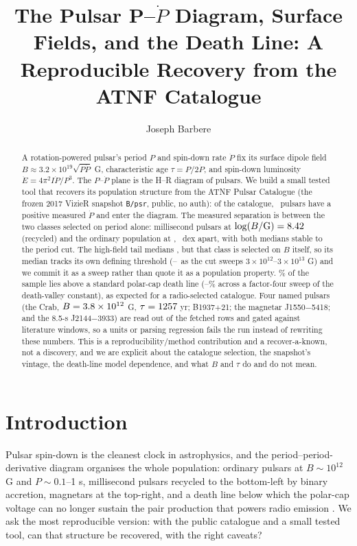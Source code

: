 \documentclass[twocolumn]{aastex631}
\newcommand{\code}[1]{\texttt{#1}}
\begin{document}
\title{The Pulsar P--$\dot P$ Diagram, Surface Fields, and the Death Line:
A Reproducible Recovery from the ATNF Catalogue}

\author[0009-0008-3289-4447]{Joseph Barbere}

\begin{abstract}
A rotation-powered pulsar's period $P$ and spin-down rate $\dot P$ fix its surface dipole field
$B\approx3.2\times10^{19}\sqrt{P\dot P}$ G, characteristic age $\tau=P/2\dot P$, and spin-down
luminosity $\dot E=4\pi^2 I\dot P/P^3$. The $P$--$\dot P$ plane is the H--R diagram of pulsars. We build
a small tested tool that recovers its population structure from the ATNF Pulsar Catalogue
\citep{manchester2005} (the frozen 2017 VizieR snapshot \code{B/psr}, public, no auth): of the
catalogue, \ppN\ pulsars have a positive measured $\dot P$ and enter the diagram. The measured
separation is between the two classes selected on period alone: millisecond pulsars at
$\log(B/\mathrm{G})=8.42$ (recycled) and the ordinary population at \ppLogBnormal,
\ppMspNormalSpanDex\ dex apart, with both medians stable to the period cut. The high-field tail
medians \ppLogBmagnetar, but that class is selected on $B$ itself, so its median tracks its own
defining threshold (\ppLogBmagnetarLoCut--\ppLogBmagnetarHiCut\ as the cut sweeps
$3\times10^{12}$--$3\times10^{13}$ G) and we commit it as a sweep rather than quote it as a
population property. \ppFracAlivePct\% of the sample lies above a standard polar-cap death line
(\ppFracAlivePctLo--\ppFracAlivePctHi\% across a factor-four sweep of the death-valley constant),
as expected for a radio-selected catalogue. Four named pulsars (the Crab, $B=3.8\times10^{12}$ G, $\tau=1257$ yr; B1937$+$21; the magnetar J1550$-$5418; and the 8.5-s J2144$-$3933) are read out of the fetched rows and gated against literature windows, so a units or parsing
regression fails the run instead of rewriting these numbers. This is a reproducibility/method
contribution and a recover-a-known, not a discovery, and we are explicit about the catalogue
selection, the snapshot's vintage, the death-line model dependence, and what $B$ and $\tau$ do
and do not mean.
\end{abstract}


\section{Introduction}
Pulsar spin-down is the cleanest clock in astrophysics, and the period--period-derivative diagram
organises the whole population: ordinary pulsars at $B\sim10^{12}$ G and $P\sim0.1$--1 s, millisecond
pulsars recycled to the bottom-left by binary accretion, magnetars at the top-right, and a death line
below which the polar-cap voltage can no longer sustain the pair production that powers radio emission
\citep{rudermansutherland1975,bhattacharya1991,lorimerkramer2004}. We ask the most reproducible version:
with the public catalogue and a small tested tool, can that structure be recovered, with the right
caveats?
\end{document}
